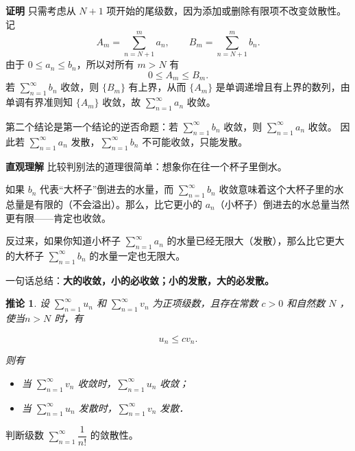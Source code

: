 \documentclass[fontset=fandol]{ctexart}
\newenvironment{custom}[1]{\par\noindent\textbf{#1}\quad}{\par\vspace{0.8em}}
\newenvironment{intuition}{\par\noindent\textbf{直观理解}\quad}{\par\vspace{0.8em}}
\newtheorem{corollary}{推论}[section] \newtheorem{property}{性质}[section]
\begin{document}
\begin{custom}{证明}
只需考虑从 $N+1$ 项开始的尾级数，因为添加或删除有限项不改变敛散性。 记
\[
A_m=\sum_{n=N+1}^{m}a_n,\qquad B_m=\sum_{n=N+1}^{m}b_n.
\]
由于 $0\le a_n\le b_n$，所以对所有 $m>N$ 有
\[
0\le A_m\le B_m.
\]
若 $\sum\limits_{n = 1}^{  \infty } b_n$ 收敛，则 $\{B_m\}$ 有上界，从而 $\{A_m\}$ 是单调递增且有上界的数列，由单调有界准则知 $\{A_m\}$ 收敛，故 $\sum\limits_{n = 1}^{  \infty } a_n$ 收敛。

第二个结论是第一个结论的逆否命题：若 $\sum\limits_{n = 1}^{  \infty } b_n$ 收敛，则 $\sum\limits_{n = 1}^{  \infty } a_n$ 收敛。 因此若 $\sum\limits_{n = 1}^{  \infty } a_n$ 发散，$\sum\limits_{n = 1}^{  \infty } b_n$ 不可能收敛，只能发散。
\end{custom}

\begin{intuition}
比较判别法的道理很简单：想象你在往一个杯子里倒水。

如果 \(b_n\) 代表“大杯子”倒进去的水量，而 \(\sum\limits_{n = 1}^{  \infty } b_n\) 收敛意味着这个大杯子里的水总量是有限的（不会溢出）。那么，比它更小的 \(a_n\)（小杯子）倒进去的水总量当然更有限——肯定也收敛。

反过来，如果你知道小杯子 \(\sum\limits_{n = 1}^{  \infty } a_n\) 的水量已经无限大（发散），那么比它更大的大杯子 \(\sum\limits_{n = 1}^{  \infty } b_n\) 的水量一定也无限大。

一句话总结：\textbf{大的收敛，小的必收敛；小的发散，大的必发散。}
\end{intuition}


\begin{corollary}
	设 $\sum\limits_{n = 1}^{  \infty } u_n$ 和 $\sum\limits_{n = 1}^{  \infty } v_n$ 为正项级数，且存在常数 $c>0$ 和自然数 $N$ ，使当$n>N$ 时，有
	
	$$
	u_n \leqslant c v_n .
	$$
	
	则有
	\begin{itemize}
		\item[（1）] 当 $\sum\limits_{n = 1}^{  \infty } v_n$ 收敛时，$\sum\limits_{n = 1}^{  \infty } u_n$ 收敛；
		\item[（2）] 当 $\sum\limits_{n = 1}^{  \infty } u_n$ 发散时，$\sum\limits_{n = 1}^{  \infty } v_n$ 发散．
	\end{itemize}
\end{corollary}

\begin{example}
判断级数 \(\sum\limits_{n = 1}^{  \infty } \dfrac{1}{n!}\) 的敛散性。
\end{example}
\end{document}
